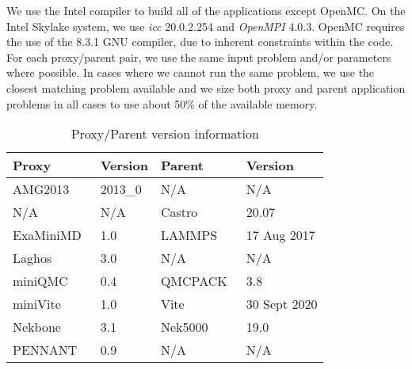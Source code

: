 We use the Intel compiler to build
all of the applications except OpenMC.  
On the Intel Skylake system, we use \emph{icc} 20.0.2.254 and
\emph{OpenMPI} 4.0.3.  OpenMC requires the use of 
the 8.3.1 GNU compiler, due to inherent constraints
within the code.
%
For each proxy/parent pair,
we use the same input problem and/or parameters where possible. 
In cases where we cannot run the same problem, we use the closest 
matching problem available and we size both proxy and parent application
problems in all cases to use about 50\% of the available memory.   
%
\begin{table}[!t]
\scriptsize
\caption{Proxy/Parent version information}
\label{tab:versions}
\centering
\begin{tabular}{ll|ll}
\toprule
\textbf{Proxy}                                  & \textbf{Version}                          & \textbf{Parent}                       & \textbf{Version}                           \\ 
\midrule
AMG2013~\cite{AMG}                    & \cellcolor{Gray!50}2013\_0       & N/A                                         & \cellcolor{Gray!50}N/A                 \\
N/A                                                 & \cellcolor{Gray!50}N/A               & Castro~\cite{Castro}               & \cellcolor{Gray!50}20.07              \\
ExaMiniMD~\cite{ostiExaMiniMD}        & \cellcolor{Gray!50}1.0               & LAMMPS~\cite{LAMMPS}      & \cellcolor{Gray!50}17 Aug 2017   \\
Laghos~\cite{Laghos}                     & \cellcolor{Gray!50}3.0               & N/A                                          & \cellcolor{Gray!50}N/A                  \\
miniQMC~\cite{richards2018fy18}  & \cellcolor{Gray!50}0.4               & QMCPACK~\cite{qmcpack}    & \cellcolor{Gray!50}3.8                  \\
miniVite~\cite{miniVite}                    & \cellcolor{Gray!50}1.0               & Vite~\cite{Vite}                        & \cellcolor{Gray!50} 30 Sept 2020  \\
Nekbone~\cite{nekbone}                 & \cellcolor{Gray!50} 3.1               & Nek5000~\cite{Nek5000}        & \cellcolor{Gray!50}19.0                 \\
PENNANT~\cite{pennant}               & \cellcolor{Gray!50}0.9                & N/A                                          & \cellcolor{Gray!50} N/A                 \\

\end{tabular}
\end{table}
